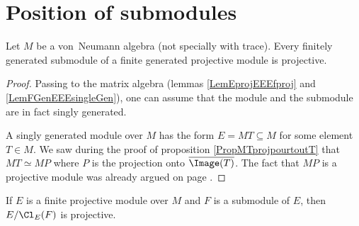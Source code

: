 
					\section{Position of submodules}

\begin{proposition}
Let $M$ be a von~Neumann algebra (not specially with trace). Every finitely generated submodule of a finite generated projective module is projective.
\end{proposition}

\begin{proof}
Passing to the matrix algebra (lemmas \ref{LemEprojEEEfproj} and \ref{LemFGenEEEsingleGen}), one can assume that the module and the submodule are in fact singly generated.

A singly generated module over $ M$ has the form $E=MT\subseteq M$ for some element $T\in M$. We saw during the proof of proposition \ref{PropMTprojpourtoutT} that $MT\simeq MP$ where $P$ is the projection onto $\overline{ \Image(T) }$. The fact that $MP$ is a projective module was already argued on page \pageref{PgMPprojModule}.
\end{proof}

\begin{proposition}			\label{PropEfgpFssmodQuotProj}
If $E$ is a finite projective module over $M$ and $F$ is a submodule of $E$, then $E/\Cl_E(F)$ is projective.
\end{proposition}

